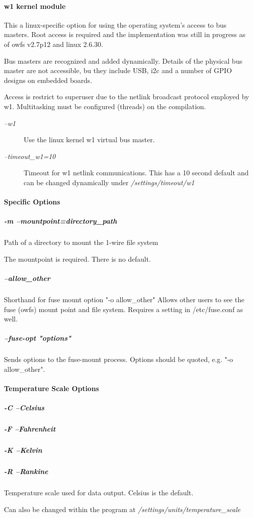 \paragraph*{ w1 kernel module}
This a linux-specific
option for using the operating system's access to bus masters. Root access
is required and the implementation was still in progress as of owfs v2.7p12
and linux 2.6.30. 

Bus masters are recognized and added dynamically. Details
of the physical bus master are not accessible, bu they include USB, i2c
and a number of GPIO designs on embedded boards. 

Access is restrict to superuser
due to the netlink broadcast protocol employed by w1. Multitasking must
be configured (threads) on the compilation. \begin{description}
\item [\textit{--w1} ] Use the linux kernel w1 virtual
bus master. 
\item [\textit{--timeout\_w1=10} ] Timeout for w1 netlink communications. This has
a 10 second default and can be changed dynamically under \textit{/settings/timeout/w1}
 
\end{description}

\paragraph*{Specific Options}

\subparagraph*{-m --mountpoint=directory\_path}Path of a directory to mount
the 1-wire file system 

The mountpoint is required. There is no default. 
\subparagraph*{--allow\_other}Shorthand
for fuse mount option "-o allow\_other"  Allows other users to see the fuse
(owfs) mount point and file system. Requires a setting in /etc/fuse.conf
as well. 
\subparagraph*{--fuse-opt "options"}Sends options to the fuse-mount process. Options
should be quoted, e.g. "-o allow\_other".
\paragraph*{Temperature Scale Options}

\subparagraph*{-C --Celsius}
\subparagraph*{-F --Fahrenheit}
\subparagraph*{-K
--Kelvin}
\subparagraph*{-R --Rankine}Temperature scale used for data output. Celsius is the default.


Can also be changed within the program at \textit{/settings/units/temperature\_scale}
           
